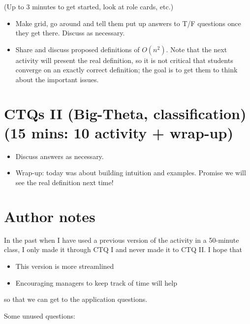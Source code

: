 \documentclass{tufte-handout}
\begin{document}
(Up to 3 minutes to get started, look at role cards, etc.)

\begin{itemize}
\item Make grid, go around and tell them put up answers to T/F
  questions once they get there.  Discuss as necessary.
\item Share and discuss proposed definitions of $O(n^2)$.  Note that
  the next activity will present the real definition, so it is not
  critical that students converge on an exactly correct definition;
  the goal is to get them to think about the important issues.
\end{itemize}

\section{CTQs II (Big-Theta, classification) (15 mins: 10 activity + wrap-up)}

\begin{itemize}
\item Discuss answers as necessary.
\item Wrap-up: today was about building intuition and
  examples. Promise we will see the real definition next time!
\end{itemize}

\newpage

\section{Author notes}
\label{sec:author}

In the past when I have used a previous version of the activity in a
50-minute class, I only made it through CTQ I and never made it to CTQ
II.  I hope that
\begin{itemize}
\item This version is more streamlined
\item Encouraging managers to keep track of time will help
\end{itemize}
so that we can get to the application questions.

Some unused questions:
\end{document}

